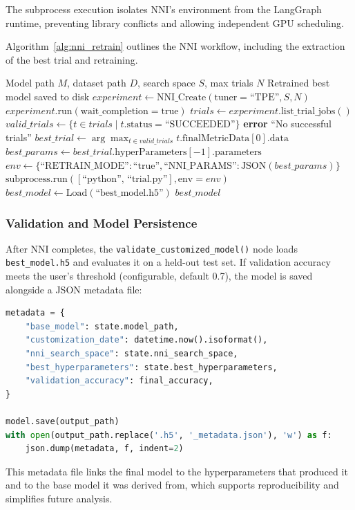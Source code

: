 The subprocess execution isolates NNI's environment from the LangGraph runtime, preventing library conflicts and allowing independent GPU scheduling.

Algorithm~\ref{alg:nni_retrain} outlines the NNI workflow, including the extraction of the best trial and retraining.

\begin{algorithm}[H]
  \caption{NNI Experiment with Automatic Best-Trial Retraining}
  \label{alg:nni_retrain}
  \begin{algorithmic}[1]
    \REQUIRE Model path $M$, dataset path $D$, search space $S$, max trials $N$
    \ENSURE Retrained best model saved to disk
    \STATE $experiment \gets \text{NNI\_Create}(\text{tuner}=\text{``TPE''}, S, N)$
    \STATE $experiment.\text{run}(\text{wait\_completion}=\text{true})$
    \STATE {}
    \STATE $trials \gets experiment.\text{list\_trial\_jobs}()$
    \STATE $valid\_trials \gets \{t \in trials \mid t.\text{status} = \text{``SUCCEEDED''}\}$
    \STATE \textbf{error} ``No successful trials''
    \ENDIF
    \STATE $best\_trial \gets \arg\max_{t \in valid\_trials} t.\text{finalMetricData}[0].\text{data}$
    \STATE $best\_params \gets best\_trial.\text{hyperParameters}[-1].\text{parameters}$
    \STATE {}
    \STATE $env \gets \{\text{``RETRAIN\_MODE''}: \text{``true''}, \text{``NNI\_PARAMS''}: \text{JSON}(best\_params)\}$
    \STATE $\text{subprocess.run}([\text{``python'', ``trial.py''}], \text{env}=env)$
    \STATE $best\_model \gets \text{Load}(\text{``best\_model.h5''})$
    \RETURN $best\_model$
  \end{algorithmic}
\end{algorithm}

\subsubsection{Validation and Model Persistence}

After NNI completes, the \texttt{validate\_\allowbreak customized\_\allowbreak model()} node loads \texttt{best\_model.h5} and evaluates it on a held-out test set. If validation accuracy meets the user's threshold (configurable, default 0.7), the model is saved alongside a JSON metadata file:

\begin{lstlisting}[language=Python, caption={Model persistence with metadata tracking}, label={lst:model_save}]
metadata = {
    "base_model": state.model_path,
    "customization_date": datetime.now().isoformat(),
    "nni_search_space": state.nni_search_space,
    "best_hyperparameters": state.best_hyperparameters,
    "validation_accuracy": final_accuracy,
}

model.save(output_path)
with open(output_path.replace('.h5', '_metadata.json'), 'w') as f:
    json.dump(metadata, f, indent=2)
\end{lstlisting}

This metadata file links the final model to the hyperparameters that produced it and to the base model it was derived from, which supports reproducibility and simplifies future analysis.
